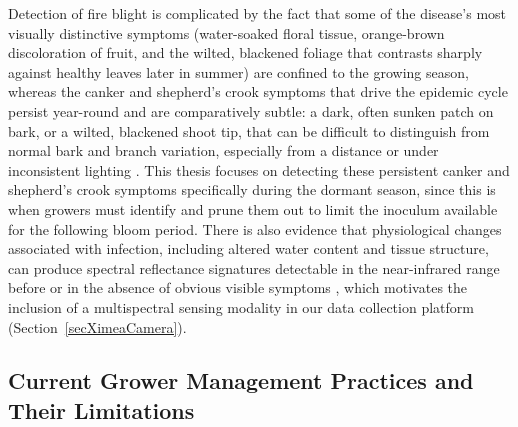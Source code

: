 Detection of fire blight is complicated by the fact that some of the disease's
most visually distinctive symptoms (water-soaked floral tissue, orange-brown
discoloration of fruit, and the wilted, blackened foliage that contrasts
sharply against healthy leaves later in summer) are confined to the growing
season, whereas the canker and shepherd's crook symptoms that drive the
epidemic cycle persist year-round and are comparatively subtle: a dark, often
sunken patch on bark, or a wilted, blackened shoot tip, that can be difficult
to distinguish from normal bark and branch variation, especially from a
distance or under inconsistent lighting \cite{Peter2023PennStateExtension}.
This thesis focuses on detecting these persistent canker and shepherd's crook
symptoms specifically during the dormant season, since this is when growers
must identify and prune them out to limit the inoculum available for the
following bloom period.
There is also evidence that physiological changes associated with infection,
including altered water content and tissue structure, can produce spectral
reflectance signatures detectable in the near-infrared range before or in the
absence of obvious visible symptoms
\cite{Bagheri2018DetectionFireBlightPearHyperspectral,
Skoneczny2020DetectionFireBlightAppleHyperspectralLeaf}, which motivates the
inclusion of a multispectral sensing modality in our data collection platform
(Section~\ref{secXimeaCamera}).

\subsection{Current Grower Management Practices and Their Limitations} \label{secFireBlightCurrentSolutions}

